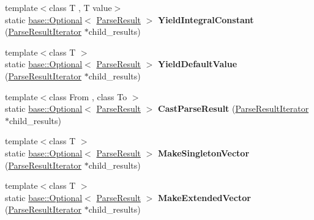 \begin{DoxyCompactItemize}
\item 
\mbox{\label{classv8_1_1internal_1_1torque_1_1Grammar_a24ba108dccf298a2434768250ba357af}} 
{\footnotesize template$<$class T , T value$>$ }\\static \mbox{\hyperlink{classv8_1_1base_1_1Optional}{base\+::\+Optional}}$<$ \mbox{\hyperlink{classv8_1_1internal_1_1torque_1_1ParseResult}{Parse\+Result}} $>$ {\bfseries Yield\+Integral\+Constant} (\mbox{\hyperlink{classv8_1_1internal_1_1torque_1_1ParseResultIterator}{Parse\+Result\+Iterator}} $\ast$child\+\_\+results)
\item 
\mbox{\label{classv8_1_1internal_1_1torque_1_1Grammar_acc945f1a391e5e8eae7771ecac3c5f98}} 
{\footnotesize template$<$class T $>$ }\\static \mbox{\hyperlink{classv8_1_1base_1_1Optional}{base\+::\+Optional}}$<$ \mbox{\hyperlink{classv8_1_1internal_1_1torque_1_1ParseResult}{Parse\+Result}} $>$ {\bfseries Yield\+Default\+Value} (\mbox{\hyperlink{classv8_1_1internal_1_1torque_1_1ParseResultIterator}{Parse\+Result\+Iterator}} $\ast$child\+\_\+results)
\item 
\mbox{\label{classv8_1_1internal_1_1torque_1_1Grammar_a6831e1b624d58172db47759267b37ad1}} 
{\footnotesize template$<$class From , class To $>$ }\\static \mbox{\hyperlink{classv8_1_1base_1_1Optional}{base\+::\+Optional}}$<$ \mbox{\hyperlink{classv8_1_1internal_1_1torque_1_1ParseResult}{Parse\+Result}} $>$ {\bfseries Cast\+Parse\+Result} (\mbox{\hyperlink{classv8_1_1internal_1_1torque_1_1ParseResultIterator}{Parse\+Result\+Iterator}} $\ast$child\+\_\+results)
\item 
\mbox{\label{classv8_1_1internal_1_1torque_1_1Grammar_a77113e93b37dc968b21711e284e03365}} 
{\footnotesize template$<$class T $>$ }\\static \mbox{\hyperlink{classv8_1_1base_1_1Optional}{base\+::\+Optional}}$<$ \mbox{\hyperlink{classv8_1_1internal_1_1torque_1_1ParseResult}{Parse\+Result}} $>$ {\bfseries Make\+Singleton\+Vector} (\mbox{\hyperlink{classv8_1_1internal_1_1torque_1_1ParseResultIterator}{Parse\+Result\+Iterator}} $\ast$child\+\_\+results)
\item 
\mbox{\label{classv8_1_1internal_1_1torque_1_1Grammar_a6cae6d2f9f5eb69fa37b824eec44fb9d}} 
{\footnotesize template$<$class T $>$ }\\static \mbox{\hyperlink{classv8_1_1base_1_1Optional}{base\+::\+Optional}}$<$ \mbox{\hyperlink{classv8_1_1internal_1_1torque_1_1ParseResult}{Parse\+Result}} $>$ {\bfseries Make\+Extended\+Vector} (\mbox{\hyperlink{classv8_1_1internal_1_1torque_1_1ParseResultIterator}{Parse\+Result\+Iterator}} $\ast$child\+\_\+results)
\end{DoxyCompactItemize}


